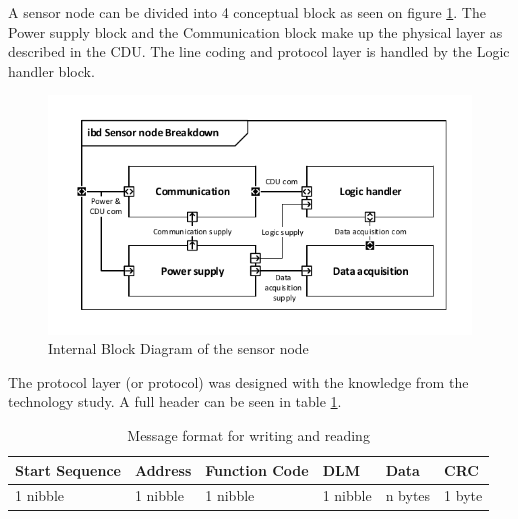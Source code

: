 A sensor node can be divided into 4 conceptual block as seen on figure \ref{fig:SN_IBD}. The Power supply block and the Communication block make up the physical layer as described in the CDU. The line coding and protocol layer is handled by the Logic handler block.
\begin{figure}[hbpt]
\centering
\includegraphics[width=.8\textwidth]{billeder/11ProjectDescription/Sensor_IBD}
\caption{Internal Block Diagram of the sensor node}
\label{fig:SN_IBD}
\end{figure}

The protocol layer (or protocol) was designed with the knowledge from the technology study. A full header can be seen in table \ref{table:stdmsgtosensor}.

\begin{table}[H]
\centering
\begin{tabular}{|l|l|l|l|l|l|}
	\hline
	Start Sequence & Address & Function Code & DLM & Data & CRC  \\ \hline
	1 nibble & 1 nibble	& 1 nibble & 1 nibble & n bytes & 1 byte\\
	\hline
\end{tabular}
\caption{Message format for writing and reading}
\label{table:stdmsgtosensor}
\end{table}


